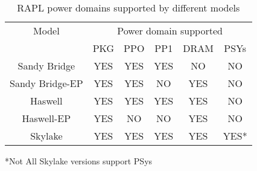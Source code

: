 
\begin{table}[H]
\centering
\begin{tabular}{|c|c|c|c|c|c|}
\hline
\multirow{2}{*}{Model} & \multicolumn{5}{c|}{\multirow{2}{*}{Power domain supported}} \\
                       & \multicolumn{5}{c|}{}                                        \\ \cline{2-6} 
                       & PKG        & PPO       & PP1       & DRAM       & PSYs       \\ \hline
Sandy Bridge           & YES        & YES       & YES       & NO         & NO         \\
Sandy Bridge-EP        & YES        & YES       & NO        & YES        & NO         \\
Haswell                & YES        & YES       & YES       & YES        & NO         \\
Haswell-EP             & YES        & NO        & NO        & YES        & NO         \\
Skylake                & YES        & YES       & YES       & YES        & YES*       \\ \hline
\end{tabular}
\newline
*Not All Skylake versions support PSys
\caption{RAPL power domains supported by different models}
\label{tab:rapltable}

\end{table}